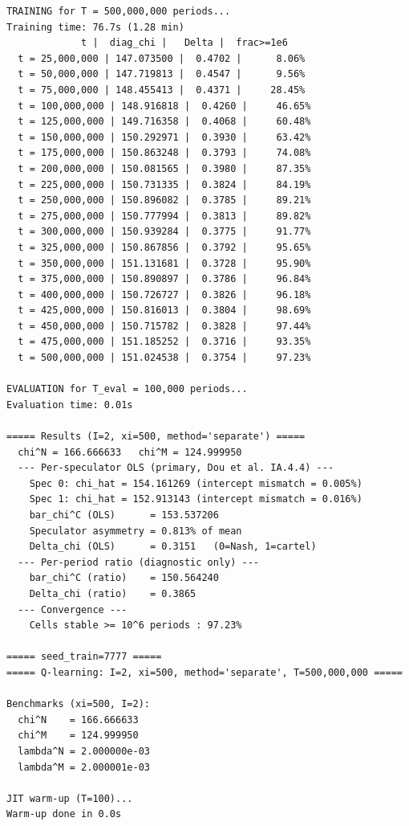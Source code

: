 \begin{lstlisting}[style=outputstyle]
TRAINING for T = 500,000,000 periods...
Training time: 76.7s (1.28 min)
             t |  diag_chi |   Delta |  frac>=1e6
  t = 25,000,000 | 147.073500 |  0.4702 |      8.06%
  t = 50,000,000 | 147.719813 |  0.4547 |      9.56%
  t = 75,000,000 | 148.455413 |  0.4371 |     28.45%
  t = 100,000,000 | 148.916818 |  0.4260 |     46.65%
  t = 125,000,000 | 149.716358 |  0.4068 |     60.48%
  t = 150,000,000 | 150.292971 |  0.3930 |     63.42%
  t = 175,000,000 | 150.863248 |  0.3793 |     74.08%
  t = 200,000,000 | 150.081565 |  0.3980 |     87.35%
  t = 225,000,000 | 150.731335 |  0.3824 |     84.19%
  t = 250,000,000 | 150.896082 |  0.3785 |     89.21%
  t = 275,000,000 | 150.777994 |  0.3813 |     89.82%
  t = 300,000,000 | 150.939284 |  0.3775 |     91.77%
  t = 325,000,000 | 150.867856 |  0.3792 |     95.65%
  t = 350,000,000 | 151.131681 |  0.3728 |     95.90%
  t = 375,000,000 | 150.890897 |  0.3786 |     96.84%
  t = 400,000,000 | 150.726727 |  0.3826 |     96.18%
  t = 425,000,000 | 150.816013 |  0.3804 |     98.69%
  t = 450,000,000 | 150.715782 |  0.3828 |     97.44%
  t = 475,000,000 | 151.185252 |  0.3716 |     93.35%
  t = 500,000,000 | 151.024538 |  0.3754 |     97.23%

EVALUATION for T_eval = 100,000 periods...
Evaluation time: 0.01s

===== Results (I=2, xi=500, method='separate') =====
  chi^N = 166.666633   chi^M = 124.999950
  --- Per-speculator OLS (primary, Dou et al. IA.4.4) ---
    Spec 0: chi_hat = 154.161269 (intercept mismatch = 0.005%)
    Spec 1: chi_hat = 152.913143 (intercept mismatch = 0.016%)
    bar_chi^C (OLS)      = 153.537206
    Speculator asymmetry = 0.813% of mean
    Delta_chi (OLS)      = 0.3151   (0=Nash, 1=cartel)
  --- Per-period ratio (diagnostic only) ---
    bar_chi^C (ratio)    = 150.564240
    Delta_chi (ratio)    = 0.3865
  --- Convergence ---
    Cells stable >= 10^6 periods : 97.23%

===== seed_train=7777 =====
===== Q-learning: I=2, xi=500, method='separate', T=500,000,000 =====

Benchmarks (xi=500, I=2):
  chi^N    = 166.666633
  chi^M    = 124.999950
  lambda^N = 2.000000e-03
  lambda^M = 2.000001e-03

JIT warm-up (T=100)...
Warm-up done in 0.0s


\end{lstlisting}
